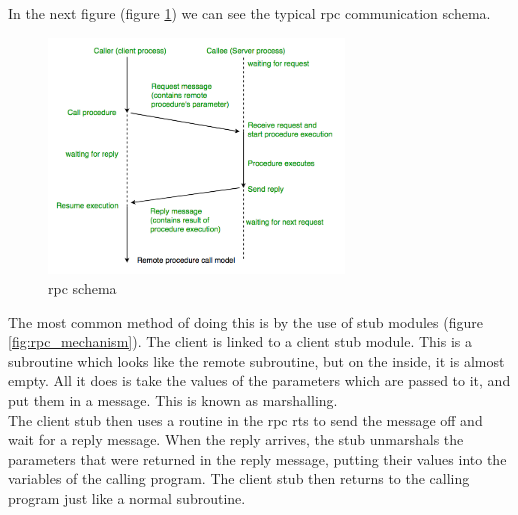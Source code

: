 \documentclass[a4paper, 12pt]{article} %
\begin{document}
                In the next figure (figure \ref{fig:rpc_schema}) we can see the typical \acrshort{rpc} communication schema.
                \begin{figure}[h]
                    \centering
                    \includegraphics[width=0.7\textwidth]{rpc.png}
                    \caption{\acrshort{rpc} schema}
                    \label{fig:rpc_schema}
                \end{figure}
                The most common method of doing this is by the use of stub modules (figure \ref{fig:rpc_mechanism}). The client is linked to a client stub module. This is a subroutine which looks like the remote subroutine, but on the inside, it is almost empty. All it does is take the values of the parameters which are passed to it, and put them in a message. This is known as marshalling.\\

                The client stub then uses a routine in the \acrshort{rpc} \acrfull{rts} to send the message off and wait for a reply message. When the reply arrives, the stub unmarshals the parameters that were returned in the reply message, putting their values into the variables of the calling program. The client stub then returns to the calling program just like a normal subroutine.\\
\end{document}
